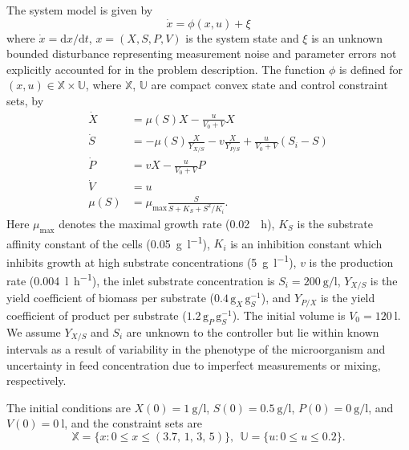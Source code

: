 \documentclass[final,5p,times,twocolumn,authoryear]{elsarticle}
\def\X{\mathbb{X}}
\def\U{\mathbb{U}}
\begin{document}
The system model is given by%
\begin{equation}\label{eq:original_ct_model}
\dot{x} = \phi (x,u) + \xi
\end{equation}
where $\dot{x}=\mathrm{d}x/\mathrm{d}t$, $x = (X,S,P,V)$ is the system state and $\xi$ is an unknown bounded disturbance representing measurement noise and parameter errors not explicitly accounted for in the problem description. 
The function $\phi$ is defined for $(x,u)\in\X\times\U$, where $\X$, $\U$ are compact convex state and control constraint sets, by
\begin{subequations}\label{eq:model}%
  \begin{align}
    \dot{X} &= \mu(S) X - \frac{u}{V_0+V} X
    \\
    \dot{S} &= -\mu(S) \frac{X}{Y_{X/S}} - v \frac{X}{Y_{P/S}} + \frac{u}{V_0+V} (S_i-S)
    \\
    \dot{P} &= vX - \frac{u}{V_0+V} P
    \\
    \dot{V} &= u
    \\
    \mu(S) &= \mu_{\max} \frac{S}{S+K_S+S^2/K_i } .
  \end{align}
\end{subequations}
Here $\mu_{\max}$ denotes the maximal growth rate (\SI{0.02}{\per\hour}),
$K_S$ is the substrate affinity constant of the cells (\SI{0.05}{\gram\per\litre}),
$K_i$ is an inhibition constant which inhibits growth at high substrate concentrations (\SI{5}{\gram\per\litre}),
$v$ is the production rate (\SI{0.004}{\litre\per\hour}),
the inlet substrate concentration is $S_i =\SI{200}{\gram\per\litre}$,
%
$Y_{X/S}$ is the yield coefficient of biomass per substrate ($0.4$\,$\text{g}_X$\,$\text{g}_S^{-1}$),
%
and $Y_{P/X}$ is the yield coefficient of product per substrate ($1.2$\,$\text{g}_P$\,$\text{g}_S^{-1}$).
%
The initial volume is $V_0 =\SI{120}{\litre}$.
%
We assume $Y_{X/S}$ and $S_i$ are unknown to the controller but lie within known intervals as a result of variability in the phenotype of the microorganism and uncertainty in feed concentration due to imperfect measurements or mixing, respectively.

%
The initial conditions are
$X(0) = \SI{1}{\gram\per\litre}$,
$S(0) = \SI{0.5}{\gram\per\litre}$,
$P(0) = \SI{0}{\gram\per\litre}$,
and
$V(0) =\SI{0}{\litre}$, and the constraint sets are
\begin{equation}\label{eq:XU}
\X = \bigl\{ x : 0 \leq x \leq (3.7,\, 1,\, 3,\, 5) \bigr\}, \ \  \U  = \bigl\{ u : 0 \leq u \leq 0.2 \bigr\}.
\end{equation}
\end{document}
